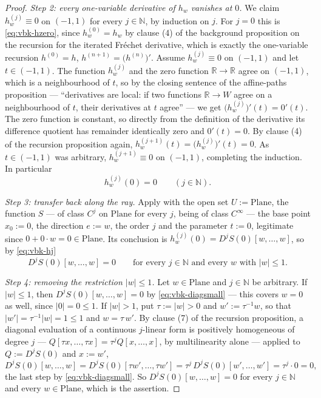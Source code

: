 \begin{proof}
\medskip\noindent\emph{Step 2: every one-variable derivative of $h_w$ vanishes at $0$.}
We claim $h_w^{(j)}\equiv0$ on $(-1,1)$ for every $j\in\mathbb{N}$, by induction on $j$.  For
$j=0$ this is \eqref{eq:vbk-hzero}, since $h_w^{(0)}=h_w$ by clause (4) of the background
proposition on the recursion for the iterated Fr\'echet derivative, which is exactly the
one-variable recursion $h^{(0)}=h$, $h^{(n+1)}=\bigl(h^{(n)}\bigr)'$.  Assume
$h_w^{(j)}\equiv0$ on $(-1,1)$ and let $t\in(-1,1)$.  The function $h_w^{(j)}$ and the zero
function $\mathbb{R}\to\mathbb{R}$ agree on $(-1,1)$, which is a neighbourhood of $t$, so by the
closing sentence of the affine-paths proposition --- ``derivatives are local: if two functions
$\mathbb{R}\to W$ agree on a neighbourhood of $t$, their derivatives at $t$ agree'' --- we get
$\bigl(h_w^{(j)}\bigr)'(t)=0'(t)$.  The zero function is constant, so directly from the
definition of the derivative its difference quotient has remainder identically zero and
$0'(t)=0$.  By clause (4) of the recursion proposition again,
$h_w^{(j+1)}(t)=\bigl(h_w^{(j)}\bigr)'(t)=0$.  As $t\in(-1,1)$ was arbitrary,
$h_w^{(j+1)}\equiv0$ on $(-1,1)$, completing the induction.  In particular
\begin{equation}\label{eq:vbk-hj}
  h_w^{(j)}(0)=0\qquad(j\in\mathbb{N}).
\end{equation}

\medskip\noindent\emph{Step 3: transfer back along the ray.}
Apply  with the open set $U:=\mathrm{Plane}$, the function $S$ ---
of class $C^{j}$ on $\mathrm{Plane}$ for every $j$, being of class $C^{\infty}$ --- the base
point $x_0:=0$, the direction $e:=w$, the order $j$ and the parameter $t:=0$, legitimate since
$0+0\cdot w=0\in\mathrm{Plane}$.  Its conclusion is $h_w^{(j)}(0)=D^{j}S(0)[w,\ldots,w]$, so by
\eqref{eq:vbk-hj}
\begin{equation}\label{eq:vbk-diagsmall}
  D^{j}S(0)[w,\ldots,w]=0\qquad\text{for every }j\in\mathbb{N}
  \text{ and every }w\text{ with }\lvert w\rvert\le1 .
\end{equation}

\medskip\noindent\emph{Step 4: removing the restriction $\lvert w\rvert\le1$.}
Let $w\in\mathrm{Plane}$ and $j\in\mathbb{N}$ be arbitrary.  If $\lvert w\rvert\le1$, then
$D^{j}S(0)[w,\ldots,w]=0$ by \eqref{eq:vbk-diagsmall} --- this covers $w=0$ as well, since
$\lvert0\rvert=0\le1$.  If $\lvert w\rvert>1$, put $\tau:=\lvert w\rvert>0$ and
$w':=\tau^{-1}w$, so that $\lvert w'\rvert=\tau^{-1}\lvert w\rvert=1\le1$ and $w=\tau\,w'$.  By
clause (7) of the recursion proposition, a diagonal evaluation of a continuous $j$-linear form
is positively homogeneous of degree $j$ --- $Q[\tau x,\ldots,\tau x]=\tau^{j}Q[x,\ldots,x]$, by
multilinearity alone --- applied to $Q:=D^{j}S(0)$ and $x:=w'$,
\[
  D^{j}S(0)[w,\ldots,w]=D^{j}S(0)[\tau w',\ldots,\tau w']
  =\tau^{j}\,D^{j}S(0)[w',\ldots,w']=\tau^{j}\cdot0=0 ,
\]
the last step by \eqref{eq:vbk-diagsmall}.  So $D^{j}S(0)[w,\ldots,w]=0$ for every
$j\in\mathbb{N}$ and every $w\in\mathrm{Plane}$, which is the assertion.
\end{proof}
